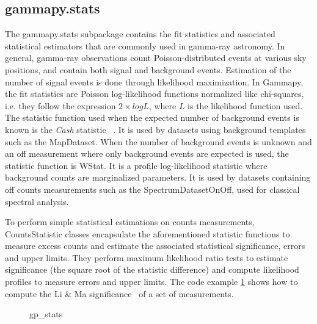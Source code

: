 \subsection{gammapy.stats}
\label{ssec:gammapy-stats}


The gammapy.stats subpackage contains the fit statistics and associated statistical estimators
that are commonly used in gamma-ray astronomy.
In general, gamma-ray observations count Poisson-distributed events at various sky positions,
and contain both signal and background events. Estimation of the number of signal events is done
through likelihood maximization. In Gammapy, the fit statistics are Poisson log-likelihood functions
normalized like chi-squares, i.e. they follow the expression $2 \times log L$, where $L$ is the
likelihood function used.
The statistic function used when the expected number of background events is known
is the \emph{Cash} statistic ~\citep{Cash}. It is used by datasets using background
templates such as the MapDataset. When the number of background events is unknown and
an off measurement where only background events are expected is used, the statistic function
is WStat. It is a profile log-likelihood statistic where background counts are
marginalized parameters. It is used by datasets containing off counts measurements
such as the SpectrumDatasetOnOff, used for classical spectral analysis.

To perform simple statistical estimations on counts measurements, CountsStatistic classes
encapsulate the aforementioned statistic functions to measure excess counts and estimate the
associated statistical significance, errors and upper limits. They perform maximum likelihood
ratio tests to estimate significance (the square root of the statistic difference) and compute
likelihood profiles to measure errors and upper limits. The code example \ref{codeexample:stats}
shows how to compute the Li \& Ma significance~\citep{LiMa} of a set of measurements.

\begin{figure}
	{gp_stats}
	\caption{}
	\label{codeexample:stats} \end{figure}

